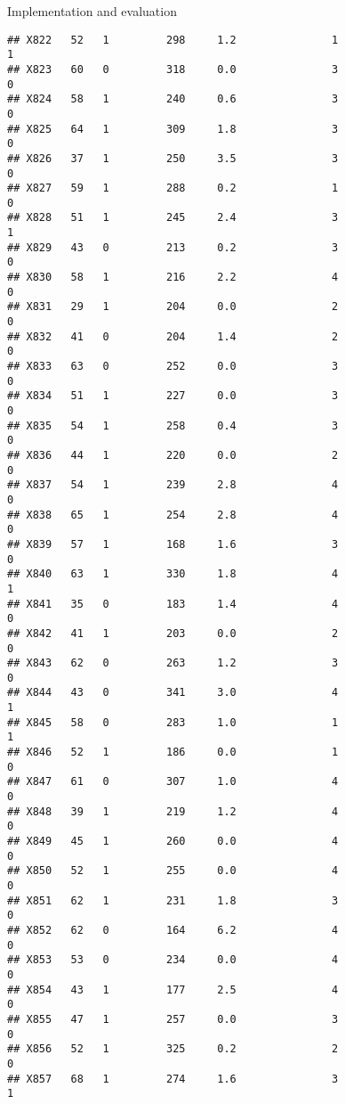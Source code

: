\documentclass[
  ignorenonframetext,
]{beamer}
\begin{document}
\begin{frame}[fragile]{Implementation and evaluation}
\begin{verbatim}
## X822   52   1         298     1.2               1                   1
## X823   60   0         318     0.0               3                   0
## X824   58   1         240     0.6               3                   0
## X825   64   1         309     1.8               3                   0
## X826   37   1         250     3.5               3                   0
## X827   59   1         288     0.2               1                   0
## X828   51   1         245     2.4               3                   1
## X829   43   0         213     0.2               3                   0
## X830   58   1         216     2.2               4                   0
## X831   29   1         204     0.0               2                   0
## X832   41   0         204     1.4               2                   0
## X833   63   0         252     0.0               3                   0
## X834   51   1         227     0.0               3                   0
## X835   54   1         258     0.4               3                   0
## X836   44   1         220     0.0               2                   0
## X837   54   1         239     2.8               4                   0
## X838   65   1         254     2.8               4                   0
## X839   57   1         168     1.6               3                   0
## X840   63   1         330     1.8               4                   1
## X841   35   0         183     1.4               4                   0
## X842   41   1         203     0.0               2                   0
## X843   62   0         263     1.2               3                   0
## X844   43   0         341     3.0               4                   1
## X845   58   0         283     1.0               1                   1
## X846   52   1         186     0.0               1                   0
## X847   61   0         307     1.0               4                   0
## X848   39   1         219     1.2               4                   0
## X849   45   1         260     0.0               4                   0
## X850   52   1         255     0.0               4                   0
## X851   62   1         231     1.8               3                   0
## X852   62   0         164     6.2               4                   0
## X853   53   0         234     0.0               4                   0
## X854   43   1         177     2.5               4                   0
## X855   47   1         257     0.0               3                   0
## X856   52   1         325     0.2               2                   0
## X857   68   1         274     1.6               3                   1

\end{verbatim}
\end{frame}
\end{document}
